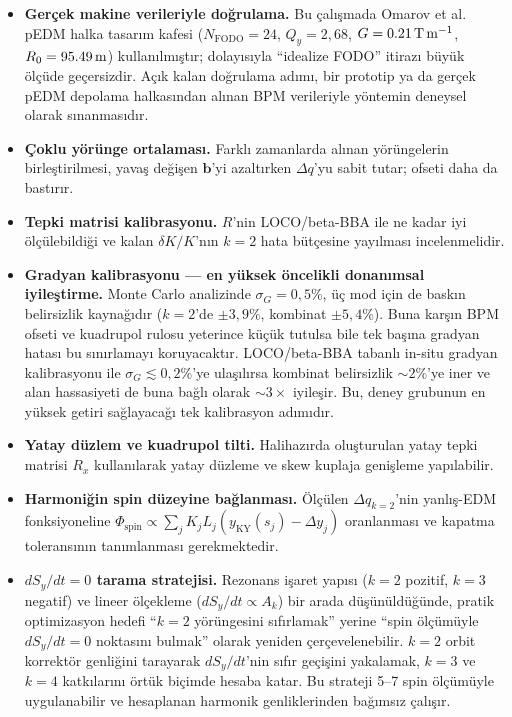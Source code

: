 \documentclass[preprint,12pt]{elsarticle}
\begin{document}
\begin{itemize}
  \item \textbf{Gerçek makine verileriyle doğrulama.}
    Bu çalışmada Omarov et al.~\cite{omarov} pEDM halka tasarım kafesi
    ($N_\mathrm{FODO}=24$, $Q_y=2{,}68$, $G=\SI{0{,}21}{\tesla\per\meter}$,
    $R_0=\SI{95{,}49}{\meter}$) kullanılmıştır; dolayısıyla ``idealize FODO''
    itirazı büyük ölçüde geçersizdir.
    Açık kalan doğrulama adımı, bir prototip ya da gerçek pEDM depolama
    halkasından alınan BPM verileriyle yöntemin deneysel olarak sınanmasıdır.
  \item \textbf{Çoklu yörünge ortalaması.}
    Farklı zamanlarda alınan yörüngelerin birleştirilmesi, yavaş değişen
    $\mathbf{b}$'yi azaltırken $\Delta q$'yu sabit tutar; ofseti daha da bastırır.
  \item \textbf{Tepki matrisi kalibrasyonu.}
    $R$'nin LOCO/beta-BBA ile ne kadar iyi ölçülebildiği ve kalan
    $\delta K/K$'nın $k=2$ hata bütçesine yayılması incelenmelidir.
  \item \textbf{Gradyan kalibrasyonu — en yüksek öncelikli donanımsal iyileştirme.}
    Monte Carlo analizinde $\sigma_G=0{,}5\%$, üç mod için de baskın belirsizlik
    kaynağıdır ($k=2$'de $\pm3{,}9\%$, kombinat $\pm5{,}4\%$). Buna karşın BPM
    ofseti ve kuadrupol rulosu yeterince küçük tutulsa bile tek başına gradyan
    hatası bu sınırlamayı koruyacaktır. LOCO/beta-BBA tabanlı in-situ gradyan
    kalibrasyonu ile $\sigma_G\lesssim0{,}2\%$'ye ulaşılırsa kombinat belirsizlik
    $\sim2\%$'ye iner ve alan hassasiyeti de buna bağlı olarak $\sim3\times$
    iyileşir. Bu, deney grubunun en yüksek getiri sağlayacağı tek kalibrasyon
    adımıdır.
  \item \textbf{Yatay düzlem ve kuadrupol tilti.}
    Halihazırda oluşturulan yatay tepki matrisi $R_x$ kullanılarak yatay
    düzleme ve skew kuplaja genişleme yapılabilir.
  \item \textbf{Harmoniğin spin düzeyine bağlanması.}
    Ölçülen $\Delta q_{k=2}$'nin yanlış-EDM fonksiyoneline
    $\Phi_\mathrm{spin}\propto\sum_j K_jL_j(y_\mathrm{KY}(s_j)-\Delta y_j)$
    oranlanması ve kapatma toleransının tanımlanması gerekmektedir.
  \item \textbf{$dS_y/dt = 0$ tarama stratejisi.}
    Rezonans işaret yapısı ($k=2$ pozitif, $k=3$ negatif) ve lineer ölçekleme
    ($dS_y/dt \propto A_k$) bir arada düşünüldüğünde, pratik optimizasyon hedefi
    ``$k=2$ yörüngesini sıfırlamak'' yerine ``spin ölçümüyle $dS_y/dt=0$ noktasını
    bulmak'' olarak yeniden çerçevelenebilir.
    $k=2$ orbit korrektör genliğini tarayarak $dS_y/dt$'nin sıfır geçişini yakalamak,
    $k=3$ ve $k=4$ katkılarını örtük biçimde hesaba katar.
    Bu strateji 5--7 spin ölçümüyle uygulanabilir ve hesaplanan harmonik genliklerinden
    bağımsız çalışır.
\end{itemize}
\end{document}
